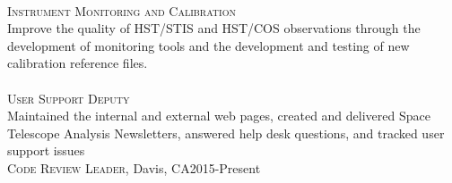 \documentclass[10pt]{cv}
\begin{document}
\begin{llist}
\\
\textsc{Instrument Monitoring and Calibration}\\
Improve the quality of HST/STIS and HST/COS observations through the development of monitoring tools and the development and testing of new calibration reference files.\\
\\
\textsc{User Support Deputy}\\
Maintained the internal and external web pages, created and delivered Space Telescope Analysis Newsletters, answered help desk questions, and tracked user support issues\\



\textsc{Code Review Leader}, Davis, CA\hfill 2015-Present\\

\end{llist}
\end{document}
